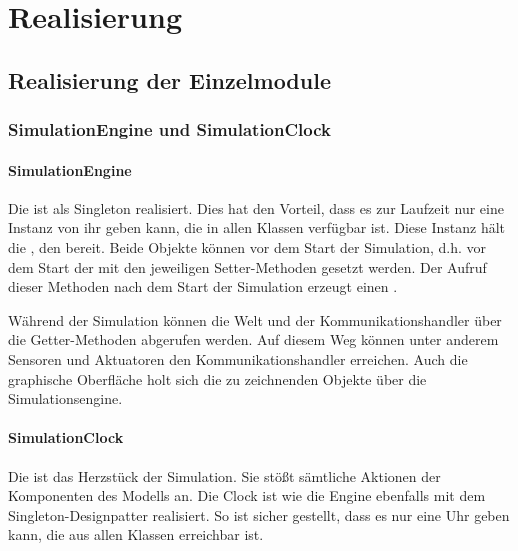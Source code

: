 \chapter{Realisierung}\label{chapter:realization}
%
\section{Realisierung der Einzelmodule}

\subsection{SimulationEngine und SimulationClock}\label{subsec:real_engine}
\subsubsection{SimulationEngine}
Die  ist als Singleton realisiert. Dies hat den Vorteil, dass es zur Laufzeit nur eine Instanz von ihr geben kann, die in allen Klassen verfügbar ist. Diese Instanz hält die , den  bereit. Beide Objekte können vor dem Start der Simulation, d.h. vor dem Start der  mit den jeweiligen Setter-Methoden gesetzt werden. Der Aufruf dieser Methoden nach dem Start der Simulation erzeugt einen .

Während der Simulation können die Welt und der Kommunikationshandler über die Getter-Methoden abgerufen werden. Auf diesem Weg können unter anderem Sensoren und Aktuatoren den Kommunikationshandler erreichen. Auch die graphische Oberfläche holt sich die zu zeichnenden Objekte über die Simulationsengine.

\subsubsection{SimulationClock}
Die  ist das Herzstück der Simulation. Sie stößt sämtliche Aktionen der Komponenten des Modells an. Die Clock ist wie die Engine ebenfalls mit dem Singleton-Designpatter realisiert. So ist sicher gestellt, dass es nur eine Uhr geben kann, die aus allen Klassen erreichbar ist.

